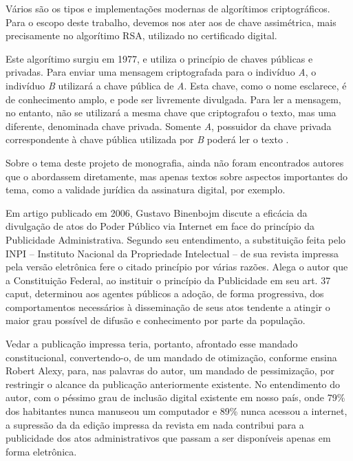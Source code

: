   Vários são os tipos e implementações modernas de algorítimos
  criptográficos. Para o escopo deste trabalho, devemos nos ater aos 
  de chave assimétrica, mais precisamente no algorítimo RSA,
  utilizado no certificado digital.\par

  Este algorítimo surgiu em 1977, e utiliza o princípio de chaves
  públicas e privadas. Para enviar uma mensagem criptografada
  para o indivíduo \emph{A}, o indivíduo \emph{B} utilizará a
  chave pública de \emph{A}. Esta chave, como o nome esclarece, é
  de conhecimento amplo, e pode ser livremente divulgada. Para
  ler a mensagem, no entanto, não se utilizará a mesma chave que
  criptografou o texto, mas uma diferente, denominada chave
  privada. Somente \emph{A}, possuidor da chave privada
  correspondente à chave pública utilizada por \emph{B} poderá
  ler o texto \cite[p. 443]{SistemasOperacionaisModernos}. \par
  


	Sobre o tema deste projeto de monografia, ainda não foram
  encontrados autores que o abordassem diretamente, mas apenas
  textos sobre aspectos importantes do tema, como a validade
  jurídica da assinatura digital, por exemplo.\par
	
	Em artigo publicado em 2006, Gustavo Binenbojm discute a
  eficácia da divulgação de atos do Poder Público via Internet em
  face do princípio da Publicidade Administrativa. Segundo seu
  entendimento, a substituição feita pelo INPI – Instituto
  Nacional da Propriedade Intelectual – de sua revista impressa
  pela versão eletrônica fere o citado princípio por várias
  razões. Alega o autor que a Constituição Federal, ao instituir
  o princípio da Publicidade em seu art. 37 caput, determinou aos
  agentes públicos a adoção, de forma progressiva, dos
  comportamentos necessários à disseminação de seus atos tendente
  a atingir o maior grau possível de difusão e conhecimento por
  parte da população. \par
	
	Vedar a publicação impressa teria, portanto, afrontado esse
  mandado constitucional, convertendo-o, de um mandado de
  otimização, conforme ensina Robert Alexy, para, nas palavras do
  autor, um mandado de pessimização, por restringir o alcance da
  publicação anteriormente existente.  No entendimento do autor,
  com o péssimo grau de inclusão digital existente em nosso país,
  onde 79\% dos habitantes nunca manuseou um computador e 89\%
  nunca acessou a internet, a supressão da da edição impressa da
  revista em nada contribui para a publicidade dos atos
  administrativos que passam a ser disponíveis apenas em forma
  eletrônica. \par
	
